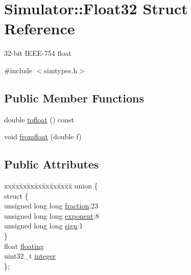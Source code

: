 \hypertarget{struct_simulator_1_1_float32}{\section{Simulator\+:\+:Float32 Struct Reference}
\label{struct_simulator_1_1_float32}
}


32-\/bit I\+E\+E\+E-\/754 float  




{\ttfamily \#include $<$simtypes.\+h$>$}

\subsection*{Public Member Functions}
\begin{DoxyCompactItemize}
\item 
double \hyperlink{struct_simulator_1_1_float32_a7f5996e5d4312bf7941c88bc050c2533}{tofloat} () const 
\item 
void \hyperlink{struct_simulator_1_1_float32_a583b5c07150e467f0c9a6380f52167c0}{fromfloat} (double f)
\end{DoxyCompactItemize}
\subsection*{Public Attributes}
\begin{DoxyCompactItemize}
\item 
\begin{tabbing}
xx\=xx\=xx\=xx\=xx\=xx\=xx\=xx\=xx\=\kill
union \{\\
\>struct \{\\
\>\>unsigned long long \hyperlink{struct_simulator_1_1_float32_a208abec59956bdaeb90fb70c5ec95a7c}{fraction}:23\\
\>\>unsigned long long \hyperlink{struct_simulator_1_1_float32_a08b7aed86fa9a607dd2afaa429f9c59b}{exponent}:8\\
\>\>unsigned long long \hyperlink{struct_simulator_1_1_float32_abf8bcfd04c3da1e1bcdb82d3b93caf42}{sign}:1\\
\>\} \\
\>float \hyperlink{struct_simulator_1_1_float32_a39b69e226a506e5149ec6cbfbcb21b6c}{floating}\\
\>uint32\_t \hyperlink{struct_simulator_1_1_float32_a4592d2c05594f4cf9e3ad621c4c702bb}{integer}\\
\}; \\

\end{tabbing}\end{DoxyCompactItemize}


